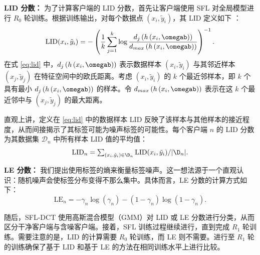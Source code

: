 \textbf{LID 分数：} 为了计算客户端的 LID 分数，首先让客户端使用 SFL 对全局模型进行 $R_0$ 轮训练。根据训练输出，对每个数据点 $(x_i,\tilde{y}_i)$，其 LID 定义如下 \cite{b9,amsaleg2015estimating,houle2013dimensionality}：
\begin{align}\label{eq:lid}
\text{LID}(x_i,\tilde{y}_i)=-\left(\frac{1}{k}\sum_{j=1}^k\log\frac{d_j\left(h\left(x_i,\omegab\right)\right)}{d_{max}\left(h\left(x_i,\omegab\right)\right)}\right)^{-1}.
\end{align}
在式 \eqref{eq:lid} 中，$d_j\left(h\left(x_i,\omegab\right)\right)$ 表示数据样本 $(x_i,\tilde{y}_i)$ 与其邻近样本 $(x_j,\tilde{y}_j)$ 在特征空间中的欧氏距离。考虑 $(x_i,\tilde{y}_i)$ 的 $k$ 个最近邻样本，即 $k$ 个具有最小 $d_j\left(h\left(x_i,\omegab\right)\right)$ 的样本。令 $d_{max}\left(h\left(x_i,\omegab\right)\right)$ 表示在这 $k$ 个最近邻中与 $(x_j,\tilde{y}_j)$ 的最大距离。

直观上讲，定义在 \eqref{eq:lid} 中的数据样本 LID 反映了该样本与其他样本的接近程度，从而间接揭示了其标签可能为噪声标签的可能性。每个客户端 $n$ 的 LID 分数为其数据集 $\mathcal{D}_n$ 中所有样本 LID 值的平均值：
\begin{equation}\label{definition of lid}
\textstyle \text{LID}_n = \sum_{(x_i,\tilde{y}_i)\in\D_{n}} \text{LID}(x_i,\tilde{y}_i)/|\D_n|.
\end{equation}

\textbf{LE 分数：} 我们提出使用标签的熵来衡量标签噪声。这一想法源于一个直观认识：随机噪声会使标签分布变得不那么集中。具体而言，LE 分数的计算方式如下：
\begin{equation}\label{eq:LE}
\text{LE}_n=-\gamma_n\log(\gamma_n)-(1-\gamma_n)\log(1-\gamma_n).
\end{equation}

随后，SFL-DCT 使用高斯混合模型（GMM）对 LID 或 LE 分数进行分类，从而区分干净客户端与含噪客户端。接着，SFL 训练过程继续进行，直到完成 $R_1$ 轮训练。需要注意的是，LID 的计算需要 $R_0$ 轮训练，而 LE 则不需要。进行至 $R_1$ 轮的训练确保了基于 LID 和基于 LE 的方法在相同训练水平上进行比较。

